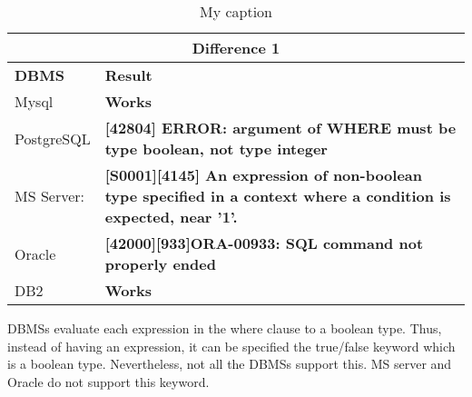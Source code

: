 \begin{table}[h]
\centering
\caption{My caption}
\label{my-label}
\begin{tabular}{|l|l|}
\hline
\multicolumn{2}{|c|}{\textbf{Difference 1}}                                                                                                                             \\ \hline
\textbf{DBMS} & \textbf{Result}                                                                                                                                         \\ \hline
Mysql         & {\color[HTML]{009901} \textbf{Works}}                                                                                                                   \\ \hline
PostgreSQL    & {\color[HTML]{FE0000} \textbf{{[}42804{]} ERROR: argument of WHERE must be type boolean, not type integer}}                                             \\ \hline
MS Server:    & {\color[HTML]{FE0000} \textbf{{[}S0001{]}{[}4145{]} An expression of non-boolean type specified in a context where a condition is expected, near '1'.}} \\ \hline
Oracle        & {\color[HTML]{FE0000} \textbf{{[}42000{]}{[}933{]}ORA-00933: SQL command not properly ended}}                                                           \\ \hline
DB2           & {\color[HTML]{009901} \textbf{Works}}                                                                                                                   \\ \hline
\end{tabular}
\end{table}

DBMSs evaluate each expression in the where clause to a boolean type. Thus, instead of having an expression, it can be specified the true/false keyword which is a boolean type. Nevertheless, not all the DBMSs support this. MS server and Oracle do not support this keyword.
